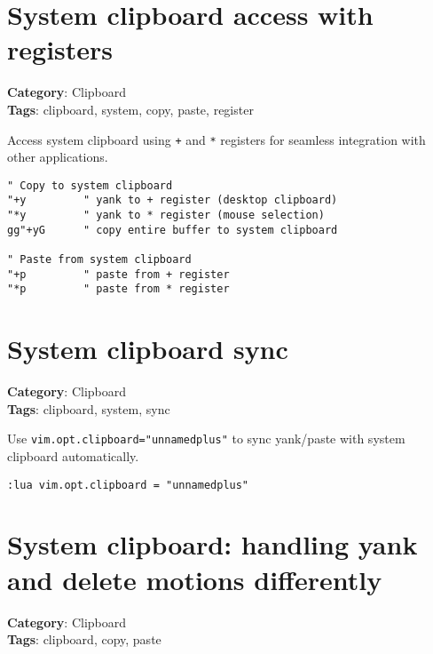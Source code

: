 {{{\section{System clipboard access with registers}

\textbf{Category}: Clipboard\\ \textbf{Tags}: clipboard, system, copy, paste, register
\vspace{0.5cm}

Access system clipboard using {\footnotesize \Verb§+§} and {\footnotesize \Verb§*§} registers for seamless integration with other applications.

\begin{Exa*}{}
\begin{Verbatim}[fontsize=\footnotesize, breaklines, breakanywhere]
" Copy to system clipboard
"+y         " yank to + register (desktop clipboard)
"*y         " yank to * register (mouse selection)
gg"+yG      " copy entire buffer to system clipboard

" Paste from system clipboard
"+p         " paste from + register
"*p         " paste from * register
\end{Verbatim}
\end{Exa*}

\section{System clipboard sync}

\textbf{Category}: Clipboard\\ \textbf{Tags}: clipboard, system, sync
\vspace{0.5cm}

Use {\footnotesize \Verb§vim.opt.clipboard="unnamedplus"§} to sync yank/paste with system clipboard automatically.

\begin{Exa*}{}
\begin{Verbatim}[fontsize=\footnotesize, breaklines, breakanywhere]
:lua vim.opt.clipboard = "unnamedplus"
\end{Verbatim}
\end{Exa*}

\section{System clipboard: handling yank and delete motions differently}

\textbf{Category}: Clipboard\\ \textbf{Tags}: clipboard, copy, paste
\vspace{0.5cm}

}}}
